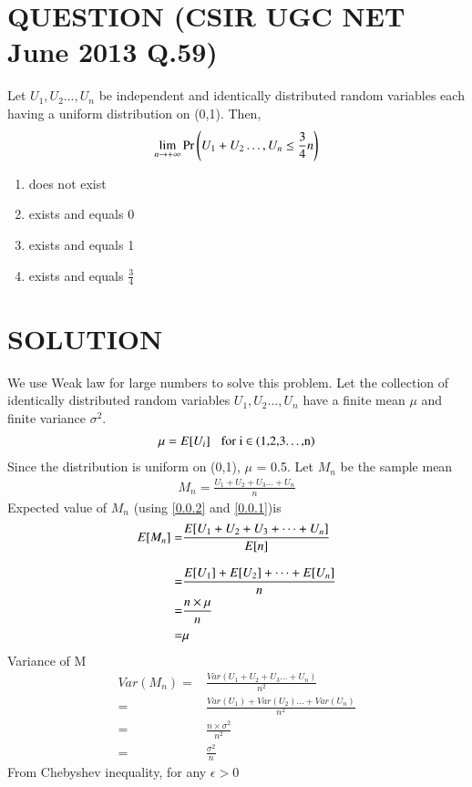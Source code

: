 \documentclass[journal,12pt,twocolumn]{IEEEtran}
\begin{document}
\section*{QUESTION (CSIR UGC NET June 2013 Q.59)}
Let $U_1,U_2\dots,U_n$ be independent and identically distributed random variables each
having a uniform distribution on (0,1). Then,$$\lim_{n \to +\infty} \Pr\left(U_1+U_2\dots,U_n\leq \frac{3}{4}n\right)$$
\begin{enumerate}
    \item does not exist
    \item exists and equals 0
    \item exists and equals 1
    \item exists and equals $\frac{3}{4}$
\end{enumerate}
\section*{SOLUTION}
We use Weak law for large numbers to solve this problem. 
Let the collection of identically distributed random variables $U_1,U_2\dots,U_n$
have a finite mean $\mu$ and finite variance $\sigma^2$.
\begin{align}
    \mu = E[U_i] \hspace{0.3cm}\text{for i $\in$ (1,2,3\dots,n)}\label{0.0.1}
\end{align}
Since the distribution is uniform on (0,1), $\mu$ = 0.5. Let $M_n$ be the sample mean
\begin{align}
     M_n = \frac{U_1+U_2+U_3\dots+U_n}{n}\label{0.0.2}
\end{align}
Expected value of $M_n$ (using \eqref{0.0.2} and \eqref{0.0.1})is
\begin{align}
    E[M_n] = &\frac{E[U_1+U_2+U_3+\dots+U_n]}{E[n]}\\[0.3cm]
     = &\frac{E[U_1]+E[U_2]+\dots+E[U_n]}{n}\\
     = &\frac{n\times\mu}{n}\\
     = & \mu
\end{align}
Variance of M
\begin{align}
    Var(M_n) =& \frac{Var(U_1+U_2+U_3\dots+U_n)}{n^2}\\[0.3cm]
    =& \frac{Var(U_1) + Var(U_2)\dots+Var(U_n)}{n^2}\\
    =& \frac{n\times{\sigma^2}}{n^2}\\[0.3cm]
    =& \frac{\sigma^2}{n} \label{0.0.10}
\end{align}
From Chebyshev inequality, for any $\epsilon > 0$
\end{document}
